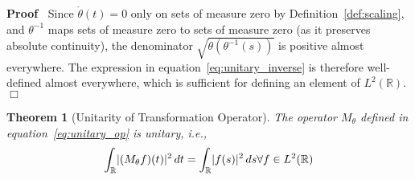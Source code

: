 \documentclass{article}
\newenvironment{proof}{\noindent\textbf{Proof\ }}{\hspace*{\fill}$\Box$\medskip}
\newtheorem{theorem}{Theorem}
\begin{document}
\begin{proof}
Since $\dot{\theta} (t) = 0$ only on sets of measure zero by
Definition~\ref{def:scaling}, and $\theta^{- 1}$ maps sets of measure zero
to sets of measure zero (as it preserves absolute continuity), the denominator $\sqrt{\dot{\theta} (\theta^{- 1} (s))}$ is positive almost
everywhere. The expression in equation~\eqref{eq:unitary_inverse} is
therefore well-defined almost everywhere, which is sufficient for defining
an element of $L^2 (\mathbb{R})$.
\end{proof}

\begin{theorem}
[Unitarity of Transformation Operator]\label{thm:unitary} The operator
$M_{\theta}$ defined in equation~\eqref{eq:unitary_op} is unitary, i.e.,
\begin{equation}
\label{eq:L2_preserve} \int_{\mathbb{R}} \lvert (M_{\theta} f) (t)
\rvert^2 \hspace{0.17em} dt = \int_{\mathbb{R}} \lvert f (s) \rvert^2
\hspace{0.17em} ds \forall f \in L^2 (\mathbb{R})
\end{equation}
\end{theorem}
\end{document}
